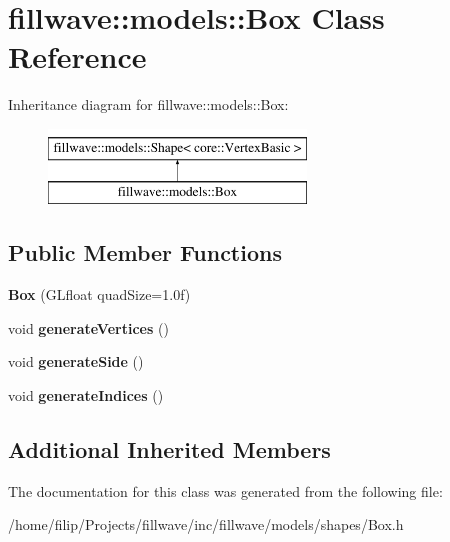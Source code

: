 \hypertarget{classfillwave_1_1models_1_1Box}{}\section{fillwave\+:\+:models\+:\+:Box Class Reference}
\label{classfillwave_1_1models_1_1Box}
Inheritance diagram for fillwave\+:\+:models\+:\+:Box\+:\begin{figure}[H]
\begin{center}
\leavevmode
\includegraphics[height=2.000000cm]{classfillwave_1_1models_1_1Box}
\end{center}
\end{figure}
\subsection*{Public Member Functions}
\begin{DoxyCompactItemize}
\item 
\hypertarget{classfillwave_1_1models_1_1Box_ae72150b181cd6030b357c945c6a3307d}{}{\bfseries Box} (G\+Lfloat quad\+Size=1.\+0f)\label{classfillwave_1_1models_1_1Box_ae72150b181cd6030b357c945c6a3307d}

\item 
\hypertarget{classfillwave_1_1models_1_1Box_a5f6af4f2e32428b7974576982aaad817}{}void {\bfseries generate\+Vertices} ()\label{classfillwave_1_1models_1_1Box_a5f6af4f2e32428b7974576982aaad817}

\item 
\hypertarget{classfillwave_1_1models_1_1Box_a5adbb7066f2eb23bbc1f9c8d5d0ac745}{}void {\bfseries generate\+Side} ()\label{classfillwave_1_1models_1_1Box_a5adbb7066f2eb23bbc1f9c8d5d0ac745}

\item 
\hypertarget{classfillwave_1_1models_1_1Box_adbf36225bd9bfa36c9b76f62bbebacf9}{}void {\bfseries generate\+Indices} ()\label{classfillwave_1_1models_1_1Box_adbf36225bd9bfa36c9b76f62bbebacf9}

\end{DoxyCompactItemize}
\subsection*{Additional Inherited Members}


The documentation for this class was generated from the following file\+:\begin{DoxyCompactItemize}
\item 
/home/filip/\+Projects/fillwave/inc/fillwave/models/shapes/Box.\+h\end{DoxyCompactItemize}
